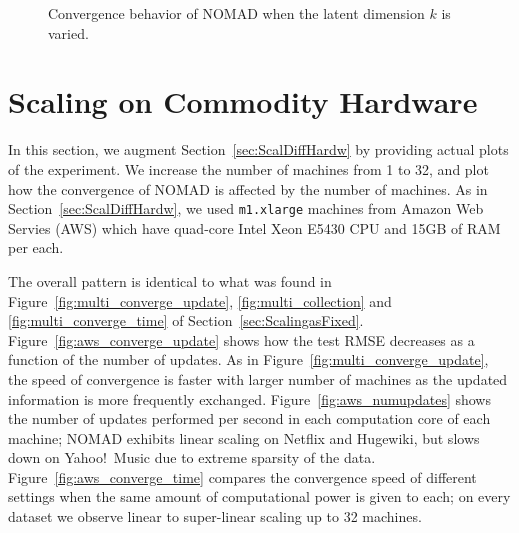\documentclass{vldb}
\begin{document}
\begin{figure*}[htbp]

  \caption{Convergence behavior of NOMAD when the latent dimension $k$
    is varied.}
  \label{fig:vary_dimension}
\end{figure*}




\section{Scaling on Commodity Hardware}
\label{app:ScalDiffHardw}

In this section, we augment Section~\ref{sec:ScalDiffHardw} by
providing actual plots of the experiment.  We increase the number of
machines from 1 to 32, and plot how the convergence of NOMAD is
affected by the number of machines.  As in
Section~\ref{sec:ScalDiffHardw}, we used \texttt{m1.xlarge} machines
from Amazon Web Servies (AWS) which have quad-core Intel Xeon E5430
CPU and 15GB of RAM per each.

The overall pattern is identical to what was found in
Figure~\ref{fig:multi_converge_update}, \ref{fig:multi_collection} and
\ref{fig:multi_converge_time} of Section~\ref{sec:ScalingasFixed}.
Figure~\ref{fig:aws_converge_update} shows how the test RMSE decreases
as a function of the number of updates.  As in
Figure~\ref{fig:multi_converge_update}, the speed of convergence is
faster with larger number of machines as the updated information is more
frequently exchanged.  Figure~\ref{fig:aws_numupdates} shows the number
of updates performed per second in each computation core of each
machine; NOMAD exhibits linear scaling on Netflix and Hugewiki, but
slows down on Yahoo!~Music due to extreme sparsity of the data.
Figure~\ref{fig:aws_converge_time} compares the convergence speed of
different settings when the same amount of computational power is given
to each; on every dataset we observe linear to super-linear scaling up
to 32 machines.
\end{document}
